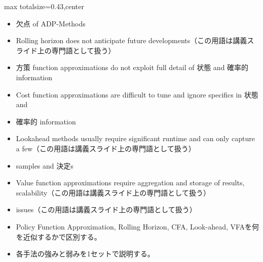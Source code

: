 \clearpage
{}
\begin{minipage}[t]{0.405\textwidth}
\begin{adjustbox}{max totalsize={\textwidth}{0.43\textheight},center}
\begin{minipage}{\textwidth}\scriptsize
{}\begin{itemize}
\item 欠点 of ADP-Methods
\item Rolling horizon does not anticipate future developments（この用語は講義スライド上の専門語として扱う）
\item 方策 function approximations do not exploit full detail of 状態 and 確率的 information
\item Cost function approximations are difficult to tune and ignore specifics in 状態 and
\item 確率的 information
\item Lookahead methods usually require significant runtime and can only capture a few（この用語は講義スライド上の専門語として扱う）
\item samples and 決定s
\item Value function approximations require aggregation and storage of results, scalability（この用語は講義スライド上の専門語として扱う）
\item issues（この用語は講義スライド上の専門語として扱う）
\end{itemize}\begin{itemize}
\item Policy Function Approximation, Rolling Horizon, CFA, Look-ahead, VFAを何を近似するかで区別する。
\item 各手法の強みと弱みを1セットで説明する。
\end{itemize}
\end{minipage}
\end{adjustbox}
\end{minipage}\hfill
